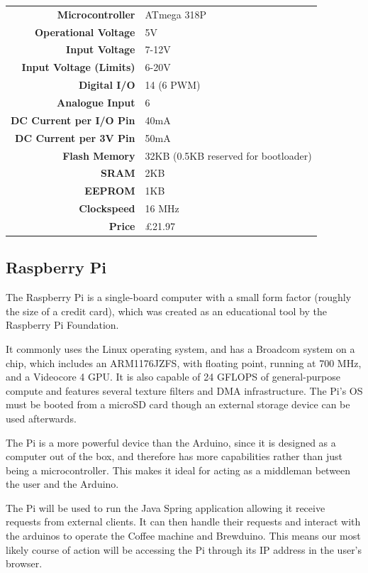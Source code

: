 \documentclass[11pt, a4paper]{article}
\begin{document}
\begin{tabular}{>{\bfseries}r l}
	Microcontroller & ATmega 318P \\
	Operational Voltage & 5V \\
	Input Voltage & 7-12V \\
	Input Voltage (Limits) & 6-20V \\
	Digital I/O & 14 (6 PWM) \\
	Analogue Input & 6 \\
	DC Current per I/O Pin & 40mA \\
	DC Current per 3V Pin & 50mA \\
	Flash Memory & 32KB (0.5KB reserved for bootloader) \\
	SRAM & 2KB \\
	EEPROM & 1KB \\
	Clockspeed & 16 MHz \\
	Price & £21.97 \\
\end{tabular}

\newpage


\subsection{Raspberry Pi}
The Raspberry Pi is a single-board computer with a small form factor (roughly
the size of a credit card), which was created as an educational tool by the
Raspberry Pi Foundation. 

It commonly uses the Linux operating system, and has a Broadcom system on a
chip, which includes an ARM1176JZFS, with floating point, running at 700 MHz,
and a Videocore 4 GPU. It is also capable of 24 GFLOPS of general-purpose
compute and features several texture filters and DMA infrastructure. The Pi’s OS
must be booted from a microSD card though an external storage device can be used
afterwards.

The Pi is a more powerful device than the Arduino, since it is designed as a
computer out of the box, and therefore has more capabilities rather than just
being a microcontroller. This makes it ideal for acting as a middleman between
the user and the Arduino.

The Pi will be used to run the Java Spring application allowing it receive 
requests from external clients. It can then handle their requests and interact 
with the arduinos to operate the Coffee machine and Brewduino. This means our
most likely course of action will be accessing the Pi through its IP address in
the user's browser.
\end{document}
